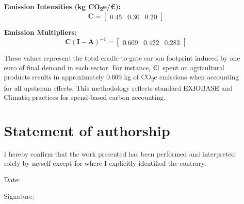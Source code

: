 \documentclass[12pt,a4paper]{article}%
\begin{document}
\textbf{Emission Intensities (kg CO\textsubscript{2}e/€):}
\[
\mathbf{C} = \begin{bmatrix} 0.45 & 0.30 & 0.20 \end{bmatrix}
\]

\textbf{Emission Multipliers:}
\[
\mathbf{C} (\mathbf{I} - \mathbf{A})^{-1} =
\begin{bmatrix}
0.609 & 0.422 & 0.283
\end{bmatrix}
\]

These values represent the total cradle-to-gate carbon footprint induced by one euro of final demand in each sector. For instance, €1 spent on agricultural products results in approximately 0.609 kg of CO\textsubscript{2}e emissions when accounting for all upstream effects. This methodology reflects standard EXIOBASE and Climatiq practices for spend-based carbon accounting.

\newpage
\thispagestyle{empty}
\section*{Statement of authorship}
I hereby confirm that the work presented has been performed and interpreted solely by myself except for where I explicitly identified the contrary.

\vspace{2cm}
Date: \underline{\hspace{5cm}}

\vspace{1cm}
Signature: \underline{\hspace{5cm}}
\end{document}

